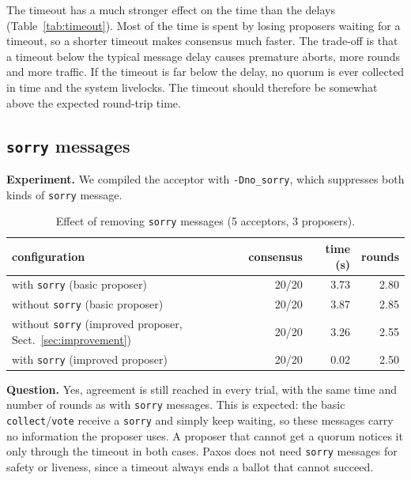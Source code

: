 \documentclass[a4paper, 10pt]{article}
\begin{document}

The timeout has a much stronger effect on the time than the delays (Table~\ref{tab:timeout}). Most of the time is spent by losing proposers waiting for a timeout, so a shorter timeout makes consensus much faster. The trade-off is that a timeout below the typical message delay causes premature aborts, more rounds and more traffic. If the timeout is far below the delay, no quorum is ever collected in time and the system livelocks. The timeout should therefore be somewhat above the expected round-trip time.

\subsection{\texttt{sorry} messages}

\textbf{Experiment.} We compiled the acceptor with \texttt{-Dno\_sorry}, which suppresses both kinds of \texttt{sorry} message.

\begin{table}[H]
\centering
\begin{tabular}{lrrr}
\toprule
configuration & consensus & time (s) & rounds \\
\midrule
with \texttt{sorry} (basic proposer)      & 20/20 & 3.73 & 2.80 \\
without \texttt{sorry} (basic proposer)   & 20/20 & 3.87 & 2.85 \\
without \texttt{sorry} (improved proposer, Sect.~\ref{sec:improvement}) & 20/20 & 3.26 & 2.55 \\
with \texttt{sorry} (improved proposer)   & 20/20 & 0.02 & 2.50 \\
\bottomrule
\end{tabular}
\caption{Effect of removing \texttt{sorry} messages (5 acceptors, 3 proposers).}
\label{tab:sorry}
\end{table}

\textbf{Question.} Yes, agreement is still reached in every trial, with the same time and number of rounds as with \texttt{sorry} messages. This is expected: the basic \texttt{collect}/\texttt{vote} receive a \texttt{sorry} and simply keep waiting, so these messages carry no information the proposer uses. A proposer that cannot get a quorum notices it only through the timeout in both cases. Paxos does not need \texttt{sorry} messages for safety or liveness, since a timeout always ends a ballot that cannot succeed.
\end{document}
